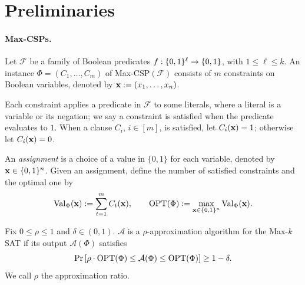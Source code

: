 \newcommand{\bw}{\mathbf{w}}

\section{Preliminaries}\label{sec:preliminaries}

 \paragraph{Max-CSPs.} Let $\mathcal F$ be a family of Boolean predicates $f:\{0,1\}^\ell\to\{0,1\}$, with $1\le\ell\le k$. An instance $\Phi=(C_1,\ldots,C_m)$ of Max-CSP$(\mathcal F)$ consists of $m$ constraints on Boolean variables, denoted by  $\mathbf{x}:= (x_1,\ldots,x_n)$. 



Each constraint applies a predicate in $\mathcal F$ to some literals, where a literal is a variable or its negation; we say a constraint is satisfied when the predicate evaluates to $1$. When a clause $C_i$, $i\in [m]$, is satisfied,  let $C_{i}(\mathbf{x})=1$; otherwise let $C_{i}(\mathbf{x})=0$.

An \textit{assignment} is a choice of a value in $\{0,1\}$ for each variable, denoted by $\mathbf{x} \in\{0,1\}^n$. Given an assignment, define the number of satisfied constraints and the optimal one by 
\[
\operatorname{Val}_\Phi(\mathbf{x}):=\sum_{t=1}^m C_t(\mathbf{x}),\qquad
\operatorname{OPT}(\Phi):=\max_{\mathbf{x}\in\{0,1\}^n}\operatorname{Val}_\Phi(\mathbf{x}).
\]



Fix $0\le\rho\le1$ and $\delta\in(0,1)$.  $\mathcal{A}$ is a $\rho$-approximation algorithm for the Max-$k$SAT if its output $\mathcal{A}(\Phi)$ satisfies 
\[
\Pr\left[\rho\cdot \operatorname{OPT}(\Phi)\le \mathcal{A}(\Phi) \le\operatorname{OPT}(\Phi) \right]\ge1-\delta.
\] We call $\rho$ the approximation ratio.







 


